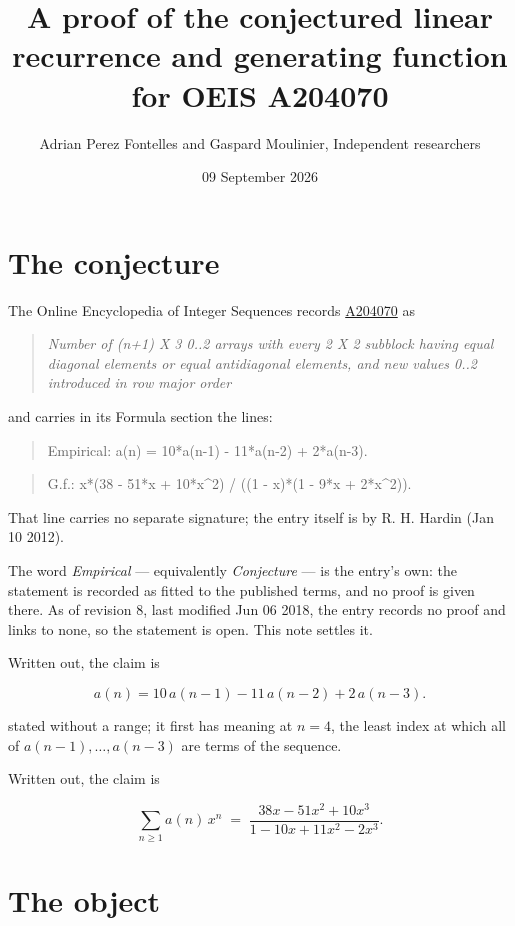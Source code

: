 \documentclass[11pt]{article}
\title{A proof of the conjectured linear recurrence and generating function for OEIS A204070}
\author{Adrian Perez Fontelles and Gaspard Moulinier, Independent researchers}
\date{09 September 2026}
\theoremstyle{definition}
\begin{document}
\maketitle
\section{The conjecture}

The Online Encyclopedia of Integer Sequences records \href{https://oeis.org/A204070}{A204070} as

\begin{quote}\itshape Number of (n+1) X 3 0..2 arrays with every 2 X 2 subblock having equal diagonal elements or equal antidiagonal elements, and new values 0..2 introduced in row major order\end{quote}

and carries in its Formula section the lines:

\begin{quote}\ttfamily Empirical: a(n) = 10*a(n-1) - 11*a(n-2) + 2*a(n-3).\end{quote}

\begin{quote}\ttfamily G.f.: x*(38 - 51*x + 10*x\textasciicircum{}2) / ((1 - x)*(1 - 9*x + 2*x\textasciicircum{}2)).\end{quote}

That line carries no separate signature; the entry itself is by R. H. Hardin (Jan 10 2012).

The word {\itshape Empirical} --- equivalently {\itshape Conjecture} --- is the entry's own: the statement is recorded as fitted to the published terms, and no proof is given there. As of revision 8, last modified Jun 06 2018, the entry records no proof and links to none, so the statement is open. This note settles it.

Written out, the claim is

\[a(n) = 10\,a(n-1) - 11\,a(n-2) + 2\,a(n-3).\]

stated without a range; it first has meaning at $n = 4$, the least index at which all of $a(n-1),\dots,a(n-3)$ are terms of the sequence.

Written out, the claim is

\[\sum_{n \ge 1} a(n)\,x^n \;=\; \frac{38x - 51x^{2} + 10x^{3}}{1 - 10x + 11x^{2} - 2x^{3}}.\]

\section{The object}
\end{document}
